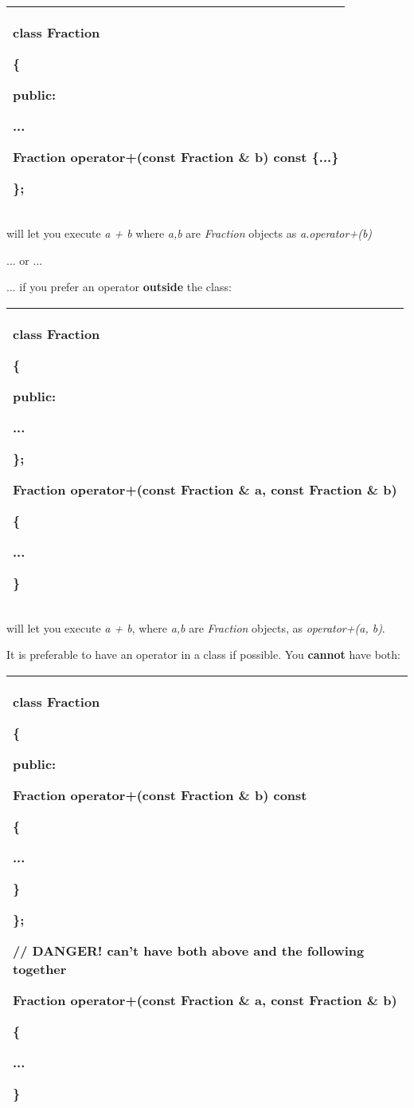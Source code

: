 \documentclass[
]{article}
\begin{document}
\begin{longtable}[]{@{}l@{}}
\toprule
\endhead
\begin{minipage}[t]{0.97\columnwidth}\raggedright
class Fraction

\{

public:

...

Fraction operator+(const Fraction \& b) const \{...\}

\};\strut
\end{minipage}\tabularnewline
\bottomrule
\end{longtable}

will let you execute \emph{a + b} where \emph{a,b} are \emph{Fraction}
objects as \emph{a.operator+(b)}

... or ...

... if you prefer an operator \textbf{outside} the class:

\begin{longtable}[]{@{}l@{}}
\toprule
\endhead
\begin{minipage}[t]{0.97\columnwidth}\raggedright
class Fraction

\{

public:

...

\};

Fraction operator+(const Fraction \& a, const Fraction \& b)

\{

...

\}\strut
\end{minipage}\tabularnewline
\bottomrule
\end{longtable}

will let you execute \emph{a + b}, where \emph{a,b} are \emph{Fraction}
objects, as \emph{operator+(a, b)}.

It is preferable to have an operator in a class if possible. You
\textbf{cannot} have both:

\begin{longtable}[]{@{}l@{}}
\toprule
\endhead
\begin{minipage}[t]{0.97\columnwidth}\raggedright
class Fraction

\{

public:

Fraction operator+(const Fraction \& b) const

\{

...

\}

\};

// \textbf{DANGER!} can't have both above and the following together

Fraction operator+(const Fraction \& a, const Fraction \& b)

\{

...

\}\strut
\end{minipage}\tabularnewline
\bottomrule
\end{longtable}
\end{document}
